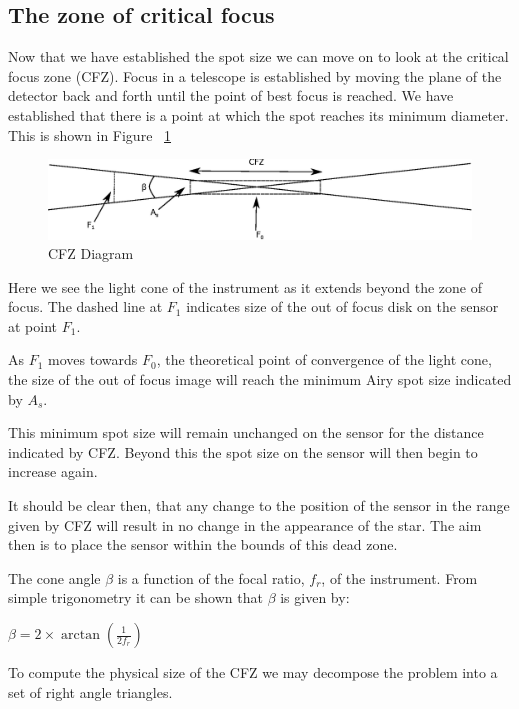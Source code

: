 \documentclass[11pt]{article}
\begin{document}
\subsection{The zone of critical focus}

Now that we have established the spot size we can move on to look at the critical focus zone (CFZ).  Focus in a telescope is established by moving the plane of the detector back and forth until the point of best focus is reached.  We have established that there is a point at which the spot reaches its minimum diameter.  This is shown in Figure ~\ref{fig:cfz}

\begin{figure}[htb]
	\begin{center}
		\includegraphics[scale=0.7]{./images/CFZ.eps}
		\caption{CFZ Diagram}
		\label{fig:cfz}
	\end{center}
\end{figure}

Here we see the light cone of the instrument as it extends beyond the zone of focus.  The dashed line at $F_{1}$ indicates size of the out of focus disk on the sensor at point $F_{1}$.  

As $F_{1}$ moves towards $F_{0}$, the theoretical point of convergence of the light cone, the size of the out of focus image will reach the minimum Airy spot size indicated by $A_{s}$.  

This minimum spot size will remain unchanged on the sensor for the distance indicated by CFZ. Beyond this the spot size on the sensor will then begin to increase again.  

It should be clear then, that any change to the position of the sensor in the range given by CFZ will result in no change in the appearance of the star.  The aim then is to place the sensor within the bounds of this dead zone.

The cone angle $\beta$ is a function of the focal ratio, $f_{r}$, of the instrument.  From simple trigonometry it can be shown that $\beta$ is given by:

$\beta=2\times\arctan(\frac{1}{2f_{r}})$

To compute the physical size of the CFZ we may decompose the problem into a set of right angle triangles.
\end{document}
